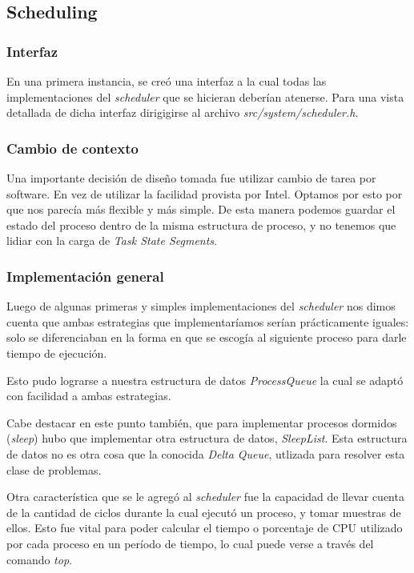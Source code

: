 \documentclass[a4paper,10pt]{article}
\begin{document}
    \subsection{Scheduling}
        
        \subsubsection{Interfaz}
        En una primera instancia, se creó una interfaz a la cual todas las implementaciones del \textit{scheduler} que se hicieran
	deberían atenerse. Para una vista detallada de dicha interfaz dirigigirse al archivo \textit{src/system/scheduler.h}.

	\subsubsection{Cambio de contexto}
	Una importante decisión de diseño tomada fue utilizar cambio de tarea por software.
	En vez de utilizar la facilidad provista por Intel.
	Optamos por esto por que nos parecía más flexible y más simple.
	De esta manera podemos guardar el estado del proceso dentro de la misma estructura de proceso, y no tenemos que lidiar con la carga de
	\textit{Task State Segments}.

        \subsubsection{Implementación general}
	Luego de algunas primeras y simples implementaciones del \textit{scheduler} nos dimos cuenta que ambas estrategias que 
	implementaríamos serían prácticamente iguales: solo se diferenciaban en la forma en que se escogía al siguiente proceso
	para darle tiempo de ejecución. 

	Esto pudo lograrse a nuestra estructura de datos \textit{ProcessQueue} la cual se adaptó con facilidad a ambas estrategias.

	Cabe destacar en este punto también, que para implementar procesos dormidos (\textit{sleep}) hubo que implementar otra estructura
	de datos, \textit{SleepList}. Esta estructura de datos no es otra cosa que la conocida \textit{Delta Queue}, utlizada para resolver 
	esta clase de problemas.

	Otra característica que se le agregó al \textit{scheduler} fue la capacidad de llevar cuenta de la cantidad de ciclos durante la cual ejecutó un proceso,
	y tomar muestras de ellos. Esto fue vital para poder calcular el tiempo o porcentaje de CPU utilizado por cada proceso en un período de tiempo,
	lo cual puede verse a través del comando \textit{top}.
\end{document}
